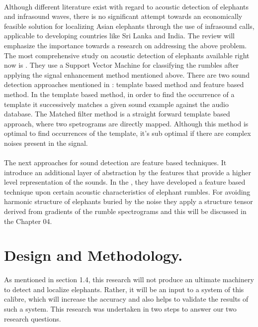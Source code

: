 \documentclass[12pt]{article}
\numberwithin{figure}{section}
\numberwithin{table}{section}
\begin{document}
\paragraph{}
Although different literature exist with regard to acoustic detection of elephants and infrasound waves, there is no significant attempt towards an economically feasible solution for localizing Asian elephants through the use of infrasound calls, applicable to developing countries like Sri Lanka and India. The review will emphasize the importance towards a research on addressing the above problem. The most comprehensive study on acoustic detection of elephants available right now is \cite{11}. They use a Support Vector Machine for classifying the rumbles after applying the signal enhancement method mentioned above. There are two sound detection approaches mentioned in \cite {11}: template based method and feature based method. In the template based method, in order to find the occurrence of a template it successively matches a given sound example against the audio database. The Matched filter method is a straight forward template based approach, where two spetrograms are directly mapped. Although this method is optimal to find occurrences of the template, it's sub optimal if there are complex noises present in the signal.

\paragraph{}
The next approaches for sound detection are feature based techniques. It introduce an additional layer of abstraction by the features that provide a higher level representation of the sounds. In the \cite{11}, they have developed a feature based technique upon certain acoustic characteristics of elephant rumbles. For avoiding harmonic structure of elephants buried by the noise they apply a structure tensor derived from gradients of the rumble spectrograms and this will be discussed in the Chapter 04. 


\newpage
\section{Design and Methodology.}
\paragraph{}
As mentioned in section 1.4, this research will not produce an ultimate machinery to detect and  localize elephants. Rather, it will be an input to a system of this calibre, which will increase the accuracy and also helps to validate the results of such a system. This research was undertaken in two steps to answer our two research questions.
\end{document}

